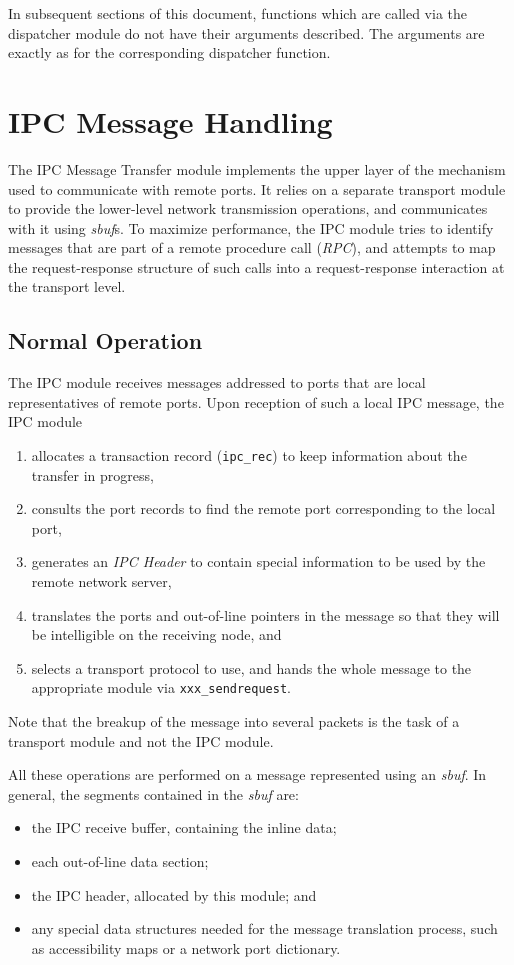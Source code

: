 In subsequent sections of this document, functions which are called
via the dispatcher module do not have their arguments described.  The
arguments are exactly as for the corresponding dispatcher function.

\section{IPC Message Handling}
The IPC Message Transfer module implements the upper layer of the mechanism
used to communicate with remote ports.  It relies on a separate transport
module to provide the lower-level network transmission operations, and
communicates with it using {\it sbuf\/}s. To maximize performance, the
IPC module tries to identify messages that are part of a remote
procedure call ({\it RPC}), and attempts to map the request-response
structure of such calls into a request-response interaction at the
transport level.

\subsection{Normal Operation} 
The IPC module receives messages addressed to ports that are local
representatives of remote ports.  Upon reception of such a local IPC
message, the IPC module
\begin{enumerate}
\item allocates a transaction record (\verb"ipc_rec") to keep
information about the transfer in progress,

\item consults the port records to find the remote port corresponding to the
local port,

\item generates an {\it IPC Header} to contain special information to be
used by the remote network server,

\item translates the ports and out-of-line pointers in the message so that
they will be intelligible on the receiving node, and

\item selects a transport protocol to use, and hands the whole message to the
appropriate module via \verb"xxx_sendrequest".
\end{enumerate}
Note that the breakup of the message into several packets is the task of
a transport module and not the IPC module. 

All these operations are performed on a message represented using an {\it
sbuf}.  In general, the segments contained in the {\it sbuf} are:
\begin{itemize}
\item the IPC receive buffer, containing the inline data;

\item each out-of-line data section;

\item the IPC header, allocated by this module; and

\item any special data structures needed for the message translation
process, such as accessibility maps or a network port dictionary.
\end{itemize}


